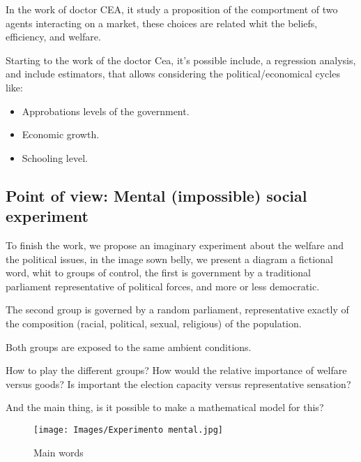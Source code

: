 \documentclass{article}
\begin{document}
In the work of doctor CEA, it study a proposition of the comportment of two agents interacting on a market, these choices are related whit the beliefs, efficiency, and welfare. 

Starting to the work of the doctor Cea, it's possible include, a regression analysis, and include estimators, that allows considering
the political/economical cycles like:

\begin{itemize}
    \item Approbations levels of the government.
    \item Economic growth.
    \item Schooling level.
\end{itemize}

\subsection{Point of view: Mental (impossible) social experiment}

To finish the work, we propose an imaginary experiment about the welfare and the political issues, in the image sown belly, we present a diagram a fictional word, whit to groups of control, the first is government by a traditional parliament representative of political forces, and more or less democratic.

The second group is governed by a random parliament, representative exactly of the composition (racial, political, sexual, religious) of the population.

Both groups are exposed to the same ambient conditions.

How to play the different groups?
How would the relative importance of welfare versus goods?
Is important the election capacity versus representative sensation?

And the main thing, is it possible to make a mathematical model for this?

\begin{figure}[H]
\texttt{[image: Images/Experimento mental.jpg]}
\centering
\caption{Main words}
\label{etiqueta}
\end{figure}





\nocite{*}
    
\end{document}
